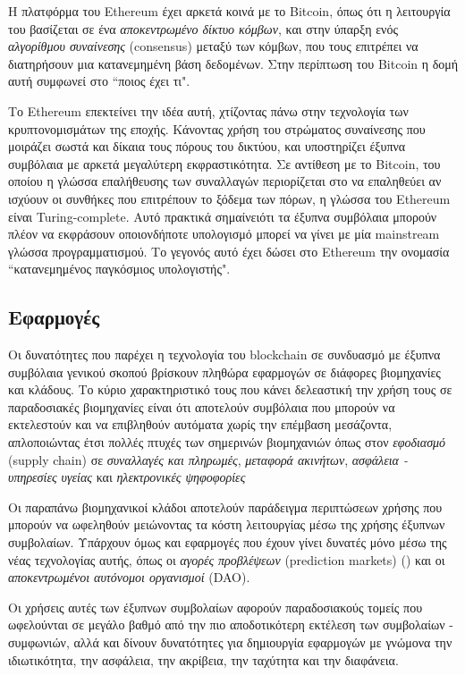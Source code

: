 Η πλατφόρμα του Ethereum έχει αρκετά κοινά με το Bitcoin, όπως ότι η λειτουργία
του βασίζεται σε ένα \textit{αποκεντρωμένο δίκτυο κόμβων}, και στην ύπαρξη ενός
\textit{αλγορίθμου συναίνεσης} (consensus) μεταξύ των κόμβων, που τους
επιτρέπει να διατηρήσουν μια κατανεμημένη βάση δεδομένων. Στην περίπτωση του
Bitcoin η δομή αυτή συμφωνεί στο ``ποιος έχει τι".

Το Ethereum επεκτείνει την ιδέα αυτή, χτίζοντας πάνω στην τεχνολογία των
κρυπτονομισμάτων της εποχής.  Κάνοντας χρήση του στρώματος συναίνεσης που
μοιράζει σωστά και δίκαια τους πόρους του δικτύου, και υποστηρίζει έξυπνα
συμβόλαια με αρκετά μεγαλύτερη εκφραστικότητα. Σε αντίθεση με το Bitcoin, του
οποίου η γλώσσα επαλήθευσης των συναλλαγών περιορίζεται στο να επαληθεύει αν
ισχύουν οι συνθήκες που επιτρέπουν το ξόδεμα των πόρων, η γλώσσα του Ethereum
είναι Turing-complete. Αυτό πρακτικά σημαίνειότι τα έξυπνα συμβόλαια μπορούν
πλέον να εκφράσουν οποιονδήποτε υπολογισμό μπορεί να γίνει με μία mainstream
γλώσσα προγραμματισμού. Το γεγονός αυτό έχει δώσει στο Ethereum την ονομασία
``κατανεμημένος παγκόσμιος υπολογιστής".

\subsection{Εφαρμογές}

Οι δυνατότητες που παρέχει η τεχνολογία του blockchain σε συνδυασμό με έξυπνα
συμβόλαια γενικού σκοπού βρίσκουν πληθώρα εφαρμογών σε διάφορες βιομηχανίες και
κλάδους. Το κύριο χαρακτηριστικό τους που κάνει δελεαστική την χρήση τους σε
παραδοσιακές βιομηχανίες είναι ότι αποτελούν συμβόλαια που μπορούν να
εκτελεστούν και να επιβληθούν αυτόματα χωρίς την επέμβαση μεσάζοντα,
απλοποιώντας έτσι πολλές πτυχές των σημερινών βιομηχανιών όπως στον
\textit{εφοδιασμό} (supply chain) σε \textit{συναλλαγές και πληρωμές},
\textit{μεταφορά ακινήτων}, \textit{ασφάλεια - υπηρεσίες υγείας} και
\textit{ηλεκτρονικές ψηφοφορίες}

Οι παραπάνω βιομηχανικοί κλάδοι αποτελούν παράδειγμα περιπτώσεων χρήσης που
μπορούν να ωφεληθούν μειώνοντας τα κόστη λειτουργίας μέσω της χρήσης έξυπνων
συμβολαίων. Υπάρχουν όμως και εφαρμογές που έχουν γίνει δυνατές μόνο μέσω της
νέας τεχνολογίας αυτής, όπως οι \emph{αγορές προβλέψεων} (prediction markets)
(\cite{augur}) και οι \emph{αποκεντρωμένοι αυτόνομοι οργανισμοί} (DAO).

Οι χρήσεις αυτές των έξυπνων συμβολαίων αφορούν παραδοσιακούς τομείς που
ωφελούνται σε μεγάλο βαθμό από την πιο αποδοτικότερη εκτέλεση των συμβολαίων -
συμφωνιών, αλλά και δίνουν δυνατότητες για δημιουργία εφαρμογών με γνώμονα την
ιδιωτικότητα, την ασφάλεια, την ακρίβεια, την ταχύτητα και την διαφάνεια.

